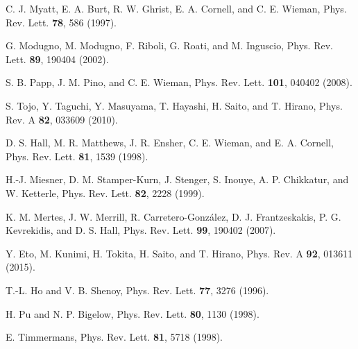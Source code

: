 \documentclass[pra,aps,superscriptaddress,twocolumn,color]{revtex4-1}
\begin{document}
\begin{thebibliography}{99}

C. J. Myatt, E. A. Burt, R. W. Ghrist, E. A. Cornell, and C. E. Wieman,
Phys. Rev. Lett. \textbf{78}, 586 (1997).

G. Modugno, M. Modugno, F. Riboli, G. Roati, and M. Inguscio,
Phys. Rev. Lett. \textbf{89}, 190404 (2002).

S. B. Papp, J. M. Pino, and C. E. Wieman,
Phys. Rev. Lett. \textbf{101}, 040402 (2008).

S. Tojo, Y. Taguchi, Y. Masuyama, T. Hayashi, H. Saito, and T. Hirano,
Phys. Rev. A \textbf{82}, 033609 (2010).

D. S. Hall, M. R. Matthews, J. R. Ensher, C. E. Wieman, and E. A. Cornell,
Phys. Rev. Lett. \textbf{81}, 1539 (1998).

H.-J. Miesner, D. M. Stamper-Kurn, J. Stenger, S. Inouye, A. P. Chikkatur,
and W. Ketterle,
Phys. Rev. Lett. \textbf{82}, 2228 (1999).

K. M. Mertes, J. W. Merrill, R. Carretero-Gonz\'alez, D. J. Frantzeskakis,
P. G. Kevrekidis, and D. S. Hall,
Phys. Rev. Lett. \textbf{99}, 190402 (2007).

Y. Eto, M. Kunimi, H. Tokita, H. Saito, and T. Hirano,
Phys. Rev. A \textbf{92}, 013611 (2015).

T.-L. Ho and V. B. Shenoy,
Phys. Rev. Lett. \textbf{77}, 3276 (1996).

H. Pu and N. P. Bigelow,
Phys. Rev. Lett. \textbf{80}, 1130 (1998).

E. Timmermans,
Phys. Rev. Lett. \textbf{81}, 5718 (1998).


\end{thebibliography}
\end{document}
